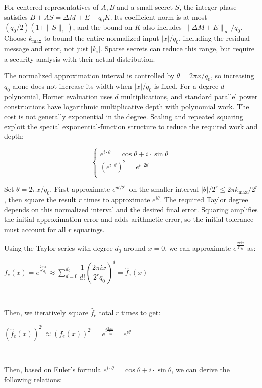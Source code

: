 For centered representatives of $A,B$ and a small secret $S$, the integer phase satisfies $B+AS=\Delta M+E+q_0K$. Its coefficient norm is at most $(q_0/2)(1+\|S\|_1)$, and the bound on $K$ also includes $\|\Delta M+E\|_\infty/q_0$. Choose $k_{\max}$ to bound the entire normalized input $|x|/q_0$, including the residual message and error, not just $|k_i|$. Sparse secrets can reduce this range, but require a security analysis with their actual distribution.

The normalized approximation interval is controlled by $\theta=2\pi x/q_0$, so increasing $q_0$ alone does not increase its width when $|x|/q_0$ is fixed. For a degree-$d$ polynomial, Horner evaluation uses $d$ multiplications, and standard parallel power constructions have logarithmic multiplicative depth with polynomial work. The cost is not generally exponential in the degree. Scaling and repeated squaring exploit the special exponential-function structure to reduce the required work and depth:

\[
\begin{cases}
e^{i\cdot \theta} = \cos \theta + i \cdot \sin \theta\\
(e^{i \cdot \theta})^2 = e^{i\cdot 2\theta}\\
\end{cases}
\]

Set $\theta=2\pi x/q_0$. First approximate $e^{i\theta/2^r}$ on the smaller interval $|\theta|/2^r\leq2\pi k_{\max}/2^r$, then square the result $r$ times to approximate $e^{i\theta}$. The required Taylor degree depends on this normalized interval and the desired final error. Squaring amplifies the initial approximation error and adds arithmetic error, so the initial tolerance must account for all $r$ squarings.

Using the Taylor series with degree $d_0$ around $x = 0$, we can approximate $e^{\frac{2\pi i x}{2^r q_0}}$ as:

$f_e(x) = e^{\frac{2\pi i x}{2^r q_0}} \approx \sum\limits_{d=0}^{d_0}\dfrac{1}{d!}\left(\dfrac{2\pi i x}{2^rq_0}\right)^d = \hat{f}_e(x)$

$ $

Then, we iteratively square $\hat{f}_e$ total $r$ times to get:

$(\hat{f}_e(x))^{2^r} \approx (f_e(x))^{2^r} = e^{i\frac{2\pi x}{q_0}} = e^{i\theta}$

$ $

Then, based on Euler's formula $e^{i\cdot \theta} = \cos \theta + i \cdot \sin \theta$, we can derive the following relations:

